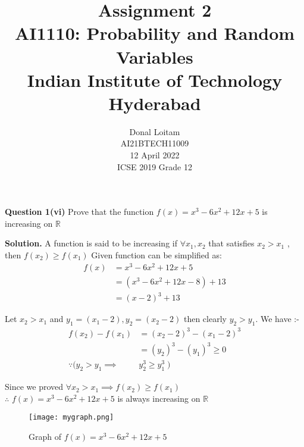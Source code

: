 \documentclass[journal,12pt,twocolumn]{IEEEtran}
\title{Assignment 2 \\ \Large AI1110: Probability and Random Variables \\ \large Indian Institute of Technology Hyderabad}
\author{Donal Loitam \\ \normalsize AI21BTECH11009 \\ \vspace*{20pt} \normalsize  12 April 2022 \\ \vspace*{20pt} \Large ICSE 2019 Grade 12}
\begin{document}
	\maketitle
	
	\textbf{Question 1(vi)} 
	Prove that the function $f(x)=x^3-6x^2+12x+5$ is increasing on $\mathbb{R}$
	
	\textbf{Solution.}
	A function is said to be increasing if $\forall x_1,x_2$ that satisfies $x_2 > x_1$ , then $f(x_2)\ge f(x_1)$
	Given function can be simplified as:
	\begin{align}
		f(x)&=x^3-6x^2+12x+5\\
		    &=(x^3-6x^2+12x-8)+13\\
		   &=(x-2)^3+13
    \end{align}
	
	Let $x_2>x_1$ and $y_1=(x_1-2),y_2=(x_2-2)$ then clearly $y_2>y_1$. We have :-
	\begin{align}
	 f(x_2)-f(x_1)&=(x_2-2)^3-(x_1-2)^3\\
	              &= (y_2)^3-(y_1)^3  \ge0\\
	  \because (y_2>y_1 \implies & y_2^3 \ge y_1^3 \;)
	\end{align}
	
  Since we proved $\forall x_2>x_1 \implies f(x_2) \ge f(x_1)$    \\ 
	$\therefore$\; $f(x)=x^3-6x^2+12x+5$ is always increasing on $\mathbb{R}$
	
	\begin{figure}[!ht]
		\centering
		\texttt{[image: mygraph.png]}
		\caption{Graph of $f(x) = x^3-6x^2+12x+5$ }
		\label{fig-1}
	\end{figure}
	
\end{document}
